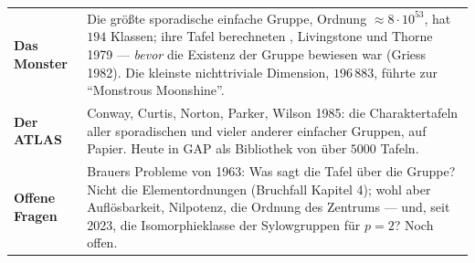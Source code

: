 \begin{forschung}
\begin{center}
{\small
\renewcommand{\arraystretch}{1.45}
\begin{tabular}{@{}P{3.0cm}P{5.2cm}@{}}
\toprule
\textbf{Das Monster} & Die größte sporadische einfache Gruppe, Ordnung $\approx8\cdot10^{53}$, hat $194$ Klassen; ihre Tafel berechneten , Livingstone und Thorne 1979 --- \emph{bevor} die Existenz der Gruppe bewiesen war (Griess 1982). Die kleinste nichttriviale Dimension, $196\,883$, führte zur \enquote{Monstrous Moonshine}.\\
\textbf{Der ATLAS} & Conway, Curtis, Norton, Parker, Wilson 1985: die Charaktertafeln aller sporadischen und vieler anderer einfacher Gruppen, auf Papier. Heute in GAP als Bibliothek von über $5000$ Tafeln.\\
\textbf{Offene Fragen} & Brauers Probleme von 1963: Was sagt die Tafel über die Gruppe? Nicht die Elementordnungen (Bruchfall Kapitel 4); wohl aber Auflösbarkeit, Nilpotenz, die Ordnung des Zentrums --- und, seit 2023, die Isomorphieklasse der Sylowgruppen für $p = 2$? Noch offen.\\
\bottomrule
\end{tabular}}
\end{center}

\begin{center}
\begin{minipage}{0.88\textwidth}
\end{minipage}
\end{center}
\end{forschung}

